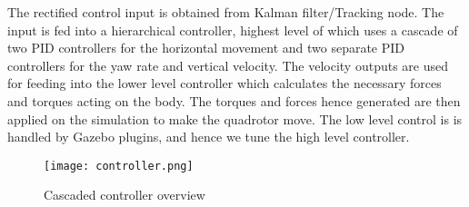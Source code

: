 	The rectified control input is obtained from Kalman filter/Tracking node. The input is fed into a hierarchical controller, highest level of which uses a cascade of two PID controllers for the horizontal movement and two separate PID controllers for the yaw rate and vertical velocity. The velocity outputs are used for feeding into the lower level controller which calculates the necessary forces and torques acting on the body. The torques and forces hence generated are then applied on the simulation to make the quadrotor move. The low level control is is handled by Gazebo plugins, and hence we tune the high level controller.	
	\begin{figure}[htb]
		\centering
		\texttt{[image: controller.png]}
		\caption{Cascaded controller overview\label{Cascaded controller overview}}
	\end{figure}
	
	